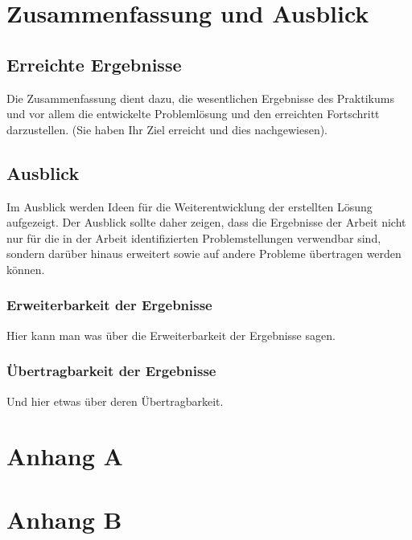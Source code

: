 \documentclass[oneside]{ausarbeitung}
\begin{document}
\chapter{Zusammenfassung und Ausblick}
\label{cha:zusammenfassung}

\section{Erreichte Ergebnisse}
\label{sec:ergebnisse}

Die Zusammenfassung dient dazu, die wesentlichen Ergebnisse des 
Praktikums und vor allem die entwickelte Problemlösung und den 
erreichten Fortschritt darzustellen. (Sie haben Ihr Ziel erreicht und 
dies nachgewiesen).

\section{Ausblick}
\label{sec:ausblick}

Im Ausblick werden Ideen für die Weiterentwicklung der erstellten Lösung 
aufgezeigt. Der Ausblick sollte daher zeigen, dass die Ergebnisse der 
Arbeit nicht nur für die in der Arbeit identifizierten Problemstellungen 
verwendbar sind, sondern darüber hinaus erweitert sowie auf andere 
Probleme übertragen werden können.

\subsection{Erweiterbarkeit der Ergebnisse}
\label{sub:erweiterbarkeit}

Hier kann man was über die Erweiterbarkeit der Ergebnisse sagen.

\subsection{Übertragbarkeit der Ergebnisse}
\label{sub:uebertragbarkeit}

Und hier etwas über deren Übertragbarkeit.

\appendix

\printbibliography[heading=bibintoc]

\chapter{Anhang A}

\chapter{Anhang B}
\end{document}
